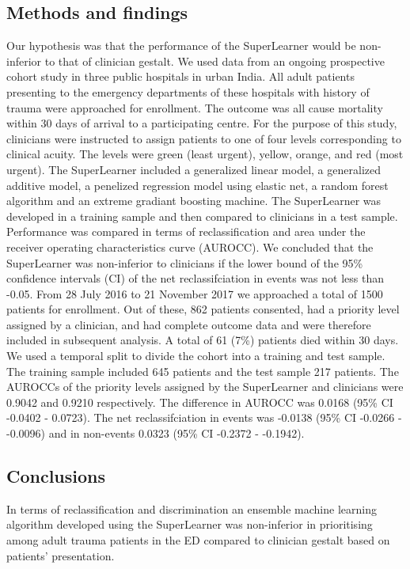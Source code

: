 \documentclass[10pt,letterpaper]{article}\usepackage[]{graphicx}\usepackage[]{color}
\begin{document}
\subsection*{Methods and findings}
Our hypothesis was that the performance of the SuperLearner would be
non-inferior to that of clinician gestalt. We used data from an ongoing
prospective cohort study in three public hospitals in urban India. All adult
patients presenting to the emergency departments of these hospitals with history
of trauma were approached for enrollment. The outcome was all cause mortality
within 30 days of arrival to a participating centre. For the purpose of this
study, clinicians were instructed to assign patients to one of four levels
corresponding to clinical acuity. The levels were green (least urgent), yellow,
orange, and red (most urgent). The SuperLearner included a generalized linear
model, a generalized additive model, a penelized regression model using elastic
net, a random forest algorithm and an extreme gradiant boosting machine. The
SuperLearner was developed in a training sample and then compared to clinicians
in a test sample. Performance was compared in terms of reclassification and area
under the receiver operating characteristics curve (AUROCC). We concluded that
the SuperLearner was non-inferior to clinicians if the lower bound of the 95\%
confidence intervals (CI) of the net reclassifciation in events was not less
than -0.05. From 28 July 2016 to 21 November 2017 we approached a total of
1500 patients for enrollment. Out of these,
862 patients consented, had a priority
level assigned by a clinician, and had complete outcome data and were therefore
included in subsequent analysis. A total of 61 (7\%)
patients died within 30 days. We used a temporal split to divide the cohort into
a training and test sample. The training sample included
645 patients and the test sample 217
patients. The AUROCCs of the priority levels assigned by the SuperLearner and
clinicians were 0.9042 and 0.9210
respectively. The difference in AUROCC was
0.0168 (95\% CI -0.0402 - 0.0723). The net reclassifciation in events was
-0.0138 (95\% CI -0.0266 - -0.0096) and in non-events 0.0323 (95\% CI -0.2372 - -0.1942).

\subsection*{Conclusions}
In terms of reclassification and discrimination an ensemble machine learning
algorithm developed using the SuperLearner was non-inferior in prioritising
among adult trauma patients in the ED compared to clinician gestalt based on
patients’ presentation.
\end{document}
